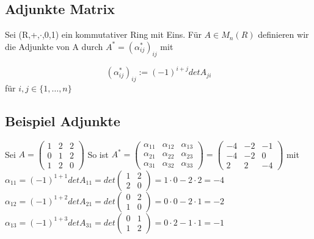 \subsection{Adjunkte Matrix}
Sei (R,+,$\cdot$,0,1) ein kommutativer Ring mit Eins. Für $A\in M_n(R)$ definieren wir \newline die Adjunkte von A durch $A^*=(\alpha_{ij}^*)_{ij}$ mit

\[
    (\alpha_{ij}^*)_{ij} := (-1)^{i+j}detA_{ji}
\]
für $i,j\in \{1,\dots,n\}$
\subsection{Beispiel Adjunkte}

Sei $A=\begin{pmatrix}
           1&2&2\\0&1&2\\1&2&0
\end{pmatrix}$ \newline
So ist $A^* = \begin{pmatrix}
                  \alpha_{11}&\alpha_{12}&\alpha_{13}\\
                  \alpha_{21}&\alpha_{22}&\alpha_{23}\\
                  \alpha_{31}&\alpha_{32}&\alpha_{33}
\end{pmatrix}= \begin{pmatrix}
                                 -4&-2&-1\\
                                 -4&-2&0\\
                                 2&2&-4
\end{pmatrix}$ \newline mit \newline\newline
$\alpha_{11}=(-1)^{1+1}detA_{11}=det\begin{pmatrix}1&2\\2&0\end{pmatrix}=1\cdot 0 - 2\cdot2=-4$ \newline
$\alpha_{12}=(-1)^{1+2}detA_{21}=det\begin{pmatrix}0&2\\1&0\end{pmatrix}=0\cdot 0 - 2\cdot1=-2$ \newline
$\alpha_{13}=(-1)^{1+3}detA_{31}=det\begin{pmatrix}0&1\\1&2\end{pmatrix}=0\cdot 2 - 1\cdot1=-1$ \newline
